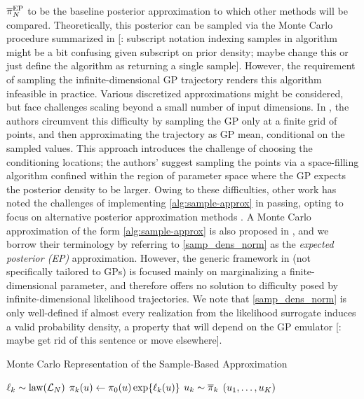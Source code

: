 \documentclass[12pt]{article}
\begin{document}
$\llikEmSampDensNorm[\Ndesign]$ to be the baseline posterior approximation to which other methods will
be compared. Theoretically, this posterior can be sampled via the Monte Carlo procedure summarized in
 [\todo: subscript notation indexing samples in algorithm might 
be a bit confusing given subscript on prior density; maybe change this or just define the algorithm as returning 
a single sample]. However, the requirement of sampling the infinite-dimensional GP trajectory renders this algorithm 
infeasible in practice. Various discretized approximations might be considered, but face challenges scaling beyond a 
small number of input dimensions. In \citet{trainDynamics}, the authors circumvent this difficulty by sampling the GP
only at a finite grid of points, and then approximating the trajectory as GP mean, conditional on the sampled values.
This approach introduces the challenge of choosing the conditioning locations; the authors' suggest sampling the 
points via a space-filling algorithm confined within the region of parameter space where the GP expects the posterior
density to be larger. Owing to these difficulties, other work has noted the challenges of implementing \cref{alg:sample-approx}
in passing, opting to focus on alternative posterior approximation methods \citep{StuartTeck1,VehtariParallelGP}.
A Monte Carlo approximation of the form \cref{alg:sample-approx} is also proposed in \citet{BurknerSurrogate}, 
and we borrow their terminology by referring to \cref{samp_dens_norm} as the
\textit{expected posterior (EP)} approximation. However, the generic framework in \citet{BurknerSurrogate}
(not specifically tailored to GPs) is focused mainly on marginalizing a finite-dimensional parameter, and therefore 
offers no solution to difficulty posed by infinite-dimensional likelihood trajectories.
We note that \cref{samp_dens_norm} is only well-defined if almost every realization from the likelihood 
surrogate induces a valid probability density, a property that will depend on the GP emulator [\todo: maybe get rid of this sentence or move elsewhere].

\begin{algorithm}
    \caption{Monte Carlo Representation of the Sample-Based Approximation}
    \label{alg:sample-approx}
    \begin{algorithmic}[1] %
        		\State $\indexSample{\ell} \sim \law(\llikEm)$ 
		\State $\indexSample{\postDens}(\Par) \gets \priorDens(\Par)\Exp{\indexSample{\ell}(\Par)}$ 
		\State $\indexSample{\Par} \sim \indexSample{\postDensNorm}$ 
	\EndFor
	\State \Return $(\indexSample[1]{\Par}, \dots, \indexSample[\NSample]{\Par})$
	\EndFunction
    \end{algorithmic}
\end{algorithm}
\end{document}
